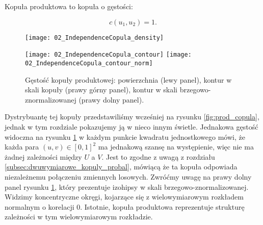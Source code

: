 \begin{df}
	Kopuła produktowa to kopuła o gęstości:
	
	$$ c(u_1, u_2) = 1.$$
	
\end{df}
\begin{figure}[h]
	\centering
	\begin{minipage}{0.5\linewidth}
		\texttt{[image: 02\_IndependenceCopula\_density]}
	\end{minipage}
	\begin{minipage}{0.45\linewidth}
		\texttt{[image: 02\_IndependenceCopula\_contour]}
		\texttt{[image: 02\_IndependenceCopula\_contour\_norm]}
	\end{minipage}
	\caption{Gęstość kopuły produktowej: powierzchnia (lewy panel), kontur w skali kopuły (prawy górny panel), kontur w skali brzegowo-znormalizowanej (prawy dolny panel). \label{fig:product_copula_density}}
\end{figure}

Dystrybuantę tej kopuły przedstawiliśmy wcześniej na rysunku \ref{fig:prod_copula}, jednak w tym rozdziale pokazujemy ją w nieco innym świetle. Jednakowa gęstość widoczna na rysunku \ref{fig:product_copula_density} w każdym punkcie kwadratu jednostkowego mówi, że każda para $(u, v) \in [0,1]^2$ ma jednakową szansę na występienie, więc nie ma żadnej zależności między $U$ a $V$. Jest to zgodne z uwagą z rozdziału \ref{subsec:dwuwymiarowe_kopuly_probal}, mówiącą że ta kopuła odpowiada niezależnemu połączeniu zmiennych losowych. Zwróćmy uwagę na prawy dolny panel rysunku \ref{fig:product_copula_density}, który prezentuje izohipsy w skali brzegowo-znormalizowanej. Widzimy koncentryczne okręgi, kojarzące się z wielowymiarowym rozkładem normalnym o korelacji $0$. Istotnie, kopuła produktowa reprezentuje strukturę zależności w tym wielowymiarowym rozkładzie.

